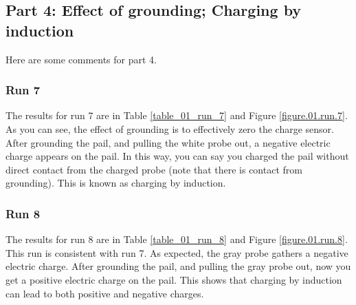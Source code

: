 \subsection{Part 4: Effect of grounding; Charging by induction}
%
Here are some comments for part 4.
%
\subsubsection{Run 7}
%
The results for run 7 are in Table \ref{table_01_run_7} and Figure \ref{figure.01.run.7}. As you can see, the effect of grounding is to effectively zero the charge sensor. After grounding the pail, and pulling the white probe out, a negative electric charge appears on the pail. In this way, you can say you charged the pail without direct contact from the charged probe (note that there is contact from grounding). This is known as charging by induction.
%
\subsubsection{Run 8}
%
The results for run 8 are in Table \ref{table_01_run_8} and Figure \ref{figure.01.run.8}. This run is consistent with run 7. As expected, the gray probe gathers a negative electric charge. After grounding the pail, and pulling the gray probe out, now you get a positive electric charge on the pail. This shows that charging by induction can lead to both positive and negative charges.
%
